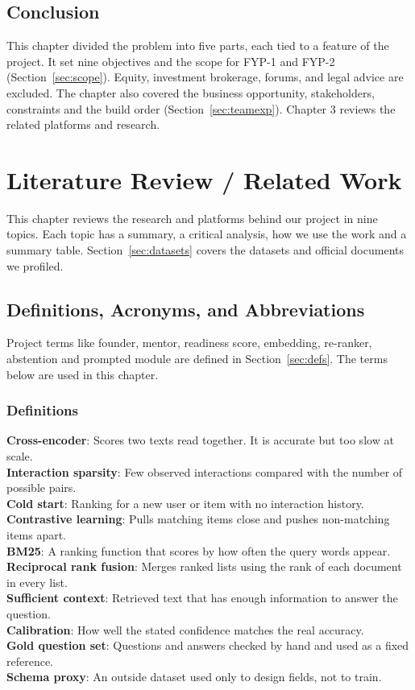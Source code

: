 \documentclass{FastFyp}
\begin{document}
\section{Conclusion}
This chapter divided the problem into five parts, each tied to a feature of the project. It set nine objectives and the scope for FYP-1 and FYP-2 (Section~\ref{sec:scope}). Equity, investment brokerage, forums, and legal advice are excluded. The chapter also covered the business opportunity, stakeholders, constraints and the build order (Section~\ref{sec:teamexp}). Chapter 3 reviews the related platforms and research.
\pagebreak


\chapter{Literature Review / Related Work}
This chapter reviews the research and platforms behind our project in nine topics. Each topic has a summary, a critical analysis, how we use the work and a summary table. Section~\ref{sec:datasets} covers the datasets and official documents we profiled.

\section{Definitions, Acronyms, and Abbreviations}
Project terms like founder, mentor, readiness score, embedding, re-ranker, abstention and prompted module are defined in Section~\ref{sec:defs}. The terms below are used in this chapter.

\subsection{Definitions}
\textbf{Cross-encoder}: Scores two texts read together. It is accurate but too slow at scale.\\
\textbf{Interaction sparsity}: Few observed interactions compared with the number of possible pairs.\\
\textbf{Cold start}: Ranking for a new user or item with no interaction history.\\
\textbf{Contrastive learning}: Pulls matching items close and pushes non-matching items apart.\\
\textbf{BM25}: A ranking function that scores by how often the query words appear.\\
\textbf{Reciprocal rank fusion}: Merges ranked lists using the rank of each document in every list.\\
\textbf{Sufficient context}: Retrieved text that has enough information to answer the question.\\
\textbf{Calibration}: How well the stated confidence matches the real accuracy.\\
\textbf{Gold question set}: Questions and answers checked by hand and used as a fixed reference.\\
\textbf{Schema proxy}: An outside dataset used only to design fields, not to train.
\end{document}
